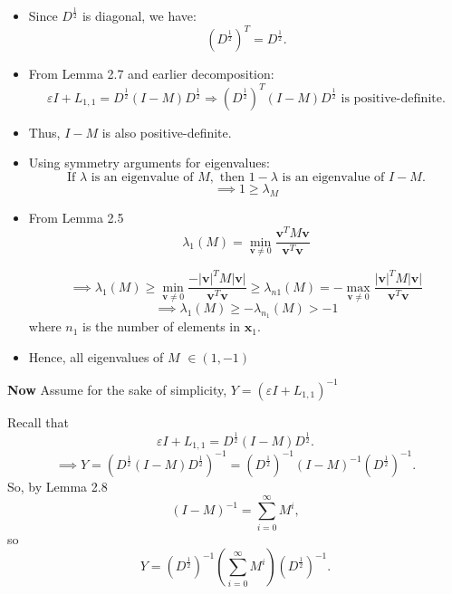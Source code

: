 \documentclass[aspectratio=169]{beamer}
\begin{document}
\begin{frame}

\begin{itemize}
  \item Since \( D^{\frac{1}{2}} \) is diagonal, we have:
  \[
  \left( D^{\frac{1}{2}} \right)^T = D^{\frac{1}{2}}.
  \]

  \item From Lemma 2.7 and earlier decomposition:
  \[
  \varepsilon I + L_{1,1} = D^{\frac{1}{2}} (I - M) D^{\frac{1}{2}}
  \Rightarrow (D^{\frac{1}{2}})^T (I - M) D^{\frac{1}{2}} \text{ is positive-definite}.
  \]

  \item Thus, \( I - M \) is also positive-definite.

  \item Using symmetry arguments for eigenvalues:
  \[
  \text{If } \lambda \text{ is an eigenvalue of } M, \text{ then } 1 - \lambda \text{ is an eigenvalue of } I - M.
  \]
    \[
  \implies 1 \ge \lambda_{M}
  \]
\end{itemize}
\end{frame}
\begin{frame}

\begin{itemize}
  \item From Lemma 2.5   \[
  \lambda_1(M) = \min_{\mathbf{v} \ne 0} \frac{\mathbf{v}^T M \mathbf{v}}{\mathbf{v}^T \mathbf{v}}
  \]

  \[ \implies \lambda_1(M)
  \ge \min_{\mathbf{v} \ne 0} \frac{-|\mathbf{v}|^T M |\mathbf{v}|}{\mathbf{v}^T \mathbf{v}} \ge \lambda_{n1}(M)
  = -\max_{\mathbf{v} \ne 0} \frac{|\mathbf{v}|^T M |\mathbf{v}|}{\mathbf{v}^T \mathbf{v}}
  \]
  \[  \implies  \lambda_1(M) \ge -\lambda_{n_1}(M) > -1  \]
  where \( n_1 \) is the number of elements in \( \mathbf{x}_1 \).

  \item Hence, all eigenvalues of \( M \) \( \in (1, -1) \)
\end{itemize}
\end{frame}



\begin{frame}

\textbf{Now} Assume for the sake of simplicity, \( Y = (\varepsilon I + L_{1,1})^{-1} \)

Recall that 
\[
\varepsilon I + L_{1,1} = D^{\frac{1}{2}}(I - M)D^{\frac{1}{2}}.
\]
\[ \implies Y = (D^{\frac{1}{2}}(I - M)D^{\frac{1}{2}})^{-1} = (D^{\frac{1}{2}})^{-1}(I - M)^{-1}(D^{\frac{1}{2}})^{-1}.
\]
So, by Lemma 2.8
\[
(I - M)^{-1} = \sum_{i=0}^{\infty} M^i,
\]
so
\[
Y = (D^{\frac{1}{2}})^{-1} \left( \sum_{i=0}^{\infty} M^i \right) (D^{\frac{1}{2}})^{-1}.
\]
\end{frame}
\end{document}
